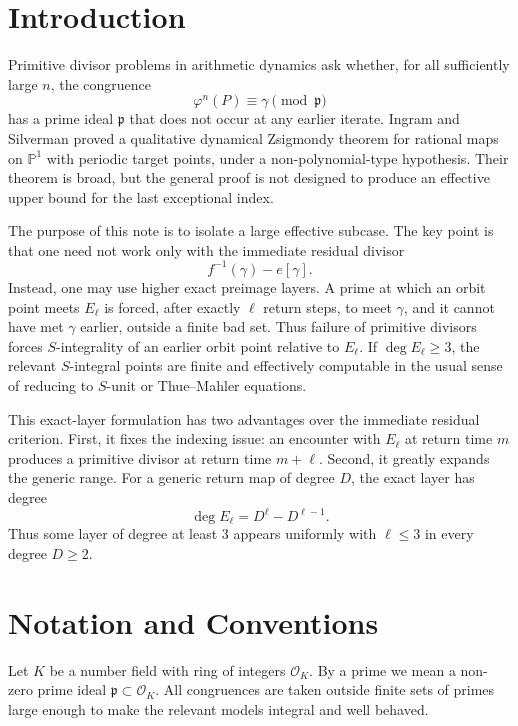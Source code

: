\documentclass[11pt]{article}
\begin{document}
\section{Introduction}

Primitive divisor problems in arithmetic dynamics ask whether, for all sufficiently large \(n\), the congruence
\[
\varphi^n(P)\equiv\gamma\pmod{\mathfrak p}
\]
has a prime ideal \(\mathfrak p\) that does not occur at any earlier iterate. Ingram and Silverman proved a qualitative dynamical Zsigmondy theorem for rational maps on \(\mathbb P^1\) with periodic target points, under a non-polynomial-type hypothesis. Their theorem is broad, but the general proof is not designed to produce an effective upper bound for the last exceptional index.

The purpose of this note is to isolate a large effective subcase. The key point is that one need not work only with the immediate residual divisor
\[
f^{-1}(\gamma)-e[\gamma].
\]
Instead, one may use higher exact preimage layers. A prime at which an orbit point meets \(E_\ell\) is forced, after exactly \(\ell\) return steps, to meet \(\gamma\), and it cannot have met \(\gamma\) earlier, outside a finite bad set. Thus failure of primitive divisors forces \(S\)-integrality of an earlier orbit point relative to \(E_\ell\). If \(\deg E_\ell\ge3\), the relevant \(S\)-integral points are finite and effectively computable in the usual sense of reducing to \(S\)-unit or Thue--Mahler equations.

This exact-layer formulation has two advantages over the immediate residual criterion. First, it fixes the indexing issue: an encounter with \(E_\ell\) at return time \(m\) produces a primitive divisor at return time \(m+\ell\). Second, it greatly expands the generic range. For a generic return map of degree \(D\), the exact layer has degree
\[
\deg E_\ell=D^\ell-D^{\ell-1}.
\]
Thus some layer of degree at least \(3\) appears uniformly with \(\ell\le3\) in every degree \(D\ge2\).

\section{Notation and Conventions}

Let \(K\) be a number field with ring of integers \(\mathcal O_K\). By a prime we mean a non-zero prime ideal \(\mathfrak p\subset\mathcal O_K\). All congruences are taken outside finite sets of primes large enough to make the relevant models integral and well behaved.
\end{document}
